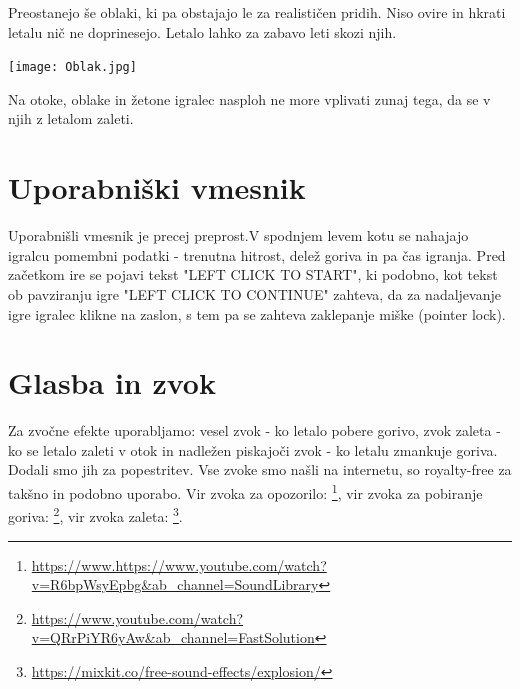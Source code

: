 \documentclass[a4paper]{article}
\begin{document}
Preostanejo še oblaki, ki pa obstajajo le za realističen pridih. Niso ovire in hkrati letalu nič ne doprinesejo. Letalo lahko za zabavo leti skozi njih.
\begin{center}
     \texttt{[image: Oblak.jpg]}
\end{center}

Na otoke, oblake in žetone igralec nasploh ne more vplivati zunaj tega, da se v njih z letalom zaleti. 

\section{Uporabniški vmesnik}%
Uporabnišli vmesnik je precej preprost.V spodnjem levem kotu se nahajajo igralcu pomembni podatki - trenutna hitrost, delež goriva in pa čas igranja. Pred začetkom ire se pojavi tekst "LEFT CLICK TO START", ki podobno, kot tekst ob pavziranju igre "LEFT CLICK TO CONTINUE" zahteva, da za nadaljevanje igre igralec klikne na zaslon, s tem pa se zahteva zaklepanje miške (pointer lock).  

\section{Glasba in zvok}%
Za zvočne efekte uporabljamo: vesel zvok - ko letalo pobere gorivo, zvok zaleta - ko se letalo zaleti v otok in nadležen piskajoči zvok - ko letalu zmankuje goriva. Dodali smo jih za popestritev. Vse zvoke smo našli na internetu, so royalty-free za takšno in podobno uporabo. Vir zvoka za opozorilo:  \footnote{\url{https://www.https://www.youtube.com/watch?v=R6bpWsyEpbg&ab_channel=SoundLibrary}}, vir zvoka za pobiranje goriva:  \footnote{\url{https://www.youtube.com/watch?v=QRrPiYR6yAw&ab_channel=FastSolution}}, vir zvoka zaleta:  \footnote{\url{https://mixkit.co/free-sound-effects/explosion/}}.
\end{document}

